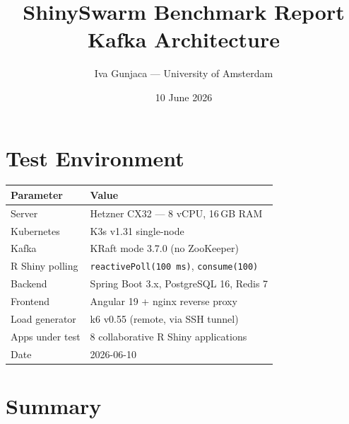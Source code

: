 \documentclass[11pt,a4paper]{article}
\title{ShinySwarm Benchmark Report\\[4pt]\large Kafka Architecture}
\author{Iva Gunjaca — University of Amsterdam}
\date{10 June 2026}
\begin{document}
\maketitle

\section{Test Environment}

\begin{tabular}{@{}ll@{}}
\toprule
\textbf{Parameter}       & \textbf{Value} \\
\midrule
Server                    & Hetzner CX32 — 8 vCPU, 16\,GB RAM \\
Kubernetes                & K3s v1.31 single-node \\
Kafka                     & KRaft mode 3.7.0 (no ZooKeeper) \\
R Shiny polling           & \texttt{reactivePoll(100\,ms)}, \texttt{consume(100)} \\
Backend                   & Spring Boot 3.x, PostgreSQL 16, Redis 7 \\
Frontend                  & Angular 19 + nginx reverse proxy \\
Load generator            & k6 v0.55 (remote, via SSH tunnel) \\
Apps under test           & 8 collaborative R Shiny applications \\
Date                      & 2026-06-10 \\
\bottomrule
\end{tabular}

\section{Summary}
\end{document}
